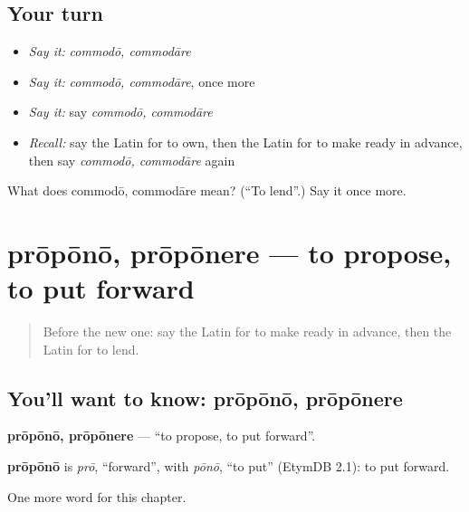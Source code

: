 \subsection*{Your turn}
\begin{itemize}
\raggedright
  \item \emph{Say it:} \emph{commodō, commodāre}
  \item \emph{Say it:} \emph{commodō, commodāre}, once more
  \item \emph{Say it:} say \emph{commodō, commodāre}
  \item \emph{Recall:} say the Latin for to own, then the Latin for to make ready in advance, then say \emph{commodō, commodāre} again
\end{itemize}

\begin{tcolorbox}[breakable,colback=teal!4,colframe=teal!35!black,title={Before you move on}]
What does commodō, commodāre mean? (\textquotedblleft{}To lend\textquotedblright{}.) Say it once more.
\end{tcolorbox}
\section[prōpōnō, prōpōnere]{prōpōnō, prōpōnere — to propose, to put forward}

\label{lesson:LA-C168-propono}



\begin{quote}
Before the new one: say the Latin for to make ready in advance, then the Latin for to lend.
\end{quote}

\subsection*{You'll want to know: prōpōnō, prōpōnere}
\textbf{prōpōnō, prōpōnere} — \textquotedblleft{}to propose, to put forward\textquotedblright{}.

\begin{cousinweb}
\textbf{prōpōnō} is \emph{prō}, \textquotedblleft{}forward\textquotedblright{}, with \emph{pōnō}, \textquotedblleft{}to put\textquotedblright{} (EtymDB 2.1): to put forward.
\end{cousinweb}

\begin{grammarlens}[title={What you've built}]
One more word for this chapter.
\end{grammarlens}

